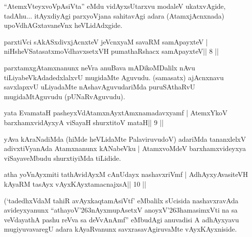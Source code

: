 \begin{artha}
``AtemxVteyxvoVpAsiVta'' eMdu vidAyxsUtarxvu modaleV ukatxvAgide, tadAhu... itAyxdiyAgi parxyoVjana sahitavAgi adara (AtamxjAcnxnada) upoVdhAGxtavaneVnx heVLidAdxgide.
\end{artha} 
 

\begin{shl}
parxtiVci sAkASxdivxjAcnxteV jeVcnxyaM savaRM samApayxteV |
niHsheVSatasatxmoVdhavxsetxVH pumathaRshacx samApayxteV\hfill || 8 ||
\end{shl}

\begin{artha}
parxtamxgAtamxnanunx neVra anuBava mADikoMDalilx nAvu tiLiyabeVkAdadedxlalxvU mugidaMte Aguvudu. (samasatx) ajAcnxnavu savxlapxvU uLiyadaMte nAshavAguvudariMda puruSAthaRvU mugidaMtAguvudu (pUNaRvAguvudu).
\end{artha}

\begin{shl}
yata EvamataH pasheyxVdAtamxnAyxtAmxnamadavxyamf |
AtemxYkoV barxhamxvidAyxyA viSayaH shurxtitoV mataH\hfill || 9 ||
\end{shl}

\begin{artha}
yAva kAraNadiMda (hiMde heVLidaMte PalaviruvudoV) adariMda tananxlelxV adivxtiVyanAda Atamxnanunx kANabeVku | AtamxvoMdeV barxhamxvideyxya viSayaveMbudu shurxtiyiMda tiLidide.
\end{artha} 
 
 

\begin{shl}
atha yoV\s nAyxmiti tathA\s vidAyxM cAnUdayx nashavxriVmf |
A\s dhAyxyAvasiteVH kAyaRM tasAyx vAyxKAyxtamacnajxsA\hfill || 10 ||
\end{shl}

\begin{artha}
(`tadedhxVdaM tahiR avAyxkaqtamAsiVtf' eMbalilx sUcisida nashavxravAda 
avideyxyanunx ``athayoV\char'263nAyxmupAsetxV anoyxV\char'263hamasimxVti na sa veVdayathA pashu reVva sa deVvAnAmf'' eMbudAgi anuvadisi A adhAyxyavu mugiyuvavaregU adara kAyaRvanunx savxrasavAgiruvaMte vAyxKAyxniside.
\end{artha} 
 
 
